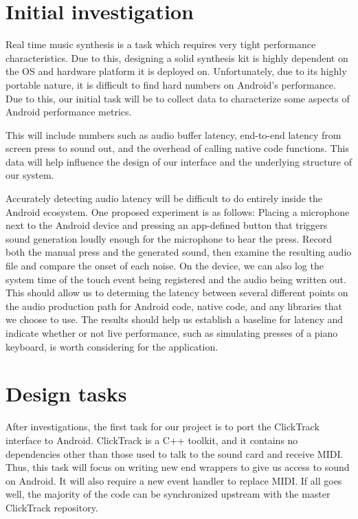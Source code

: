 \documentclass[letterpaper,12pt]{article}
\begin{document}
\section*{Initial investigation}

Real time music synthesis is a task which requires very tight performance
characteristics. Due to this, designing a solid synthesis kit is highly
dependent on the OS and hardware platform it is deployed on. Unfortunately,
due to its highly portable nature, it is difficult to find hard numbers on
Android's performance. Due to this, our initial task will be to collect data
to characterize some aspects of Android performance metrics.

This will include numbers such as audio buffer latency, end-to-end latency from
screen press to sound out, and the overhead of calling native code functions.
This data will help influence the design of our interface and the underlying
structure of our system.

Accurately detecting audio latency will be difficult to do entirely inside the
Android ecosystem. One proposed experiment is as follows: Placing a microphone
next to the Android device and pressing an app-defined button that triggers
sound generation loudly enough for the microphone to hear the press. Record both
the manual press and the generated sound, then examine the resulting audio file
and compare the onset of each noise. On the device, we can also log the system
time of the touch event being registered and the audio being written out. This
should allow us to determing the latency between several different points on the
audio production path for Android code, native code, and any libraries that we
choose to use. The results should help us establish a baseline for latency and
indicate whether or not live performance, such as simulating presses of a piano
keyboard, is worth considering for the application.


\section*{Design tasks}

After investigations, the first task for our project is to port the ClickTrack
interface to Android.  ClickTrack is a C++ toolkit, and it contains no
dependencies other than those used to talk to the sound card and receive MIDI.
Thus, this task will focus on writing new end wrappers to give us access to
sound on Android. It will also require a new event handler to replace MIDI. If
all goes well, the majority of the code can be synchronized upstream with the
master ClickTrack repository.
\end{document}
